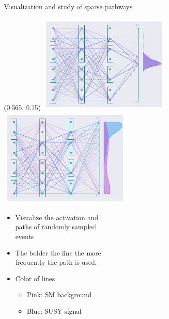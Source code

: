 \documentclass[UKenglish]{beamer}
\begin{document}
\begin{frame}{Visualization and study of sparse pathways}
    \begin{textblock}{0.8}(0.565, 0.15)
        \includegraphics[width = 0.5\textwidth]{figures/NetworkVis/BeforeTraining.pdf}
        \includegraphics[width = 0.5\textwidth]{figures/NetworkVis/AfterTraining.pdf}
    \end{textblock}
    \begin{itemize}
        \item Visualize the activation and \\
        paths of randomly sampled \\
        events
        \item The bolder the line the more\\ 
        frequently the path is used.
        \item Color of lines 
        \begin{itemize}
            \item Pink: SM background
            \item Blue: SUSY signal
        \end{itemize}
    \end{itemize}
\end{frame}
\end{document}

